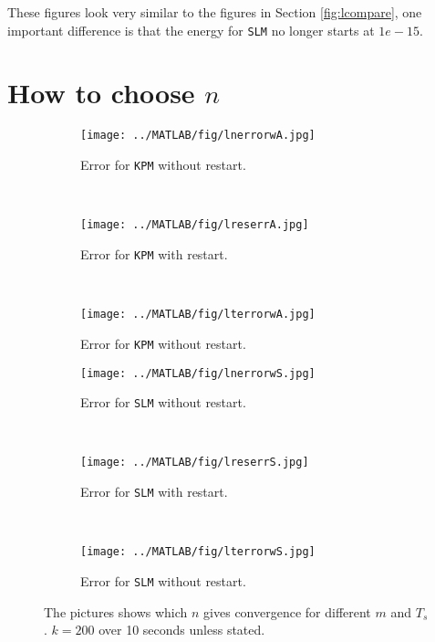 These figures look very similar to the figures in Section \ref{fig:lcompare}, one important difference is that the energy for \texttt{SLM} no longer starts at $1e-15$.%

\section{How to choose $n$} \label{sec:resultatv}

\begin{figure}[H]
        \centering
        \begin{subfigure}[b]{0.30\textwidth}
                \texttt{[image: ../MATLAB/fig/lnerrorwA.jpg]}
                \caption{ Error for \texttt{KPM} without restart. }
                \label{fig:lnerrorwA}
        \end{subfigure}
        ~
        \begin{subfigure}[b]{0.30\textwidth}
                \texttt{[image: ../MATLAB/fig/lreserrA.jpg]}
                \caption{ Error for \texttt{KPM} with restart.\\ }
                \label{fig:lreserrA}
        \end{subfigure}
        ~
        \begin{subfigure}[b]{0.30\textwidth}
                \texttt{[image: ../MATLAB/fig/lterrorwA.jpg]}
                \caption{ Error for \texttt{KPM} without restart. }
                \label{fig:lterrorwA}
        \end{subfigure}

        
        \begin{subfigure}[b]{0.30\textwidth}
                \texttt{[image: ../MATLAB/fig/lnerrorwS.jpg]}
                \caption{ Error for \texttt{SLM} without restart. }
                \label{fig:lnerrorwS}
        \end{subfigure}
		~
        \begin{subfigure}[b]{0.30\textwidth}
                \texttt{[image: ../MATLAB/fig/lreserrS.jpg]}
                \caption{ Error for \texttt{SLM} with restart.\\ }
                \label{fig:lreserrS}
        \end{subfigure}
        ~
        \begin{subfigure}[b]{0.30\textwidth}
                \texttt{[image: ../MATLAB/fig/lterrorwS.jpg]}
                \caption{ Error for \texttt{SLM} without restart. }
                \label{fig:lterrorwS}
        \end{subfigure}
        
        
        \caption{ The pictures shows which $n$ gives convergence for different $m$ and $T_s$. $k = 200$ over 10 seconds unless stated. }
        \label{fig:lerror}
\end{figure}
